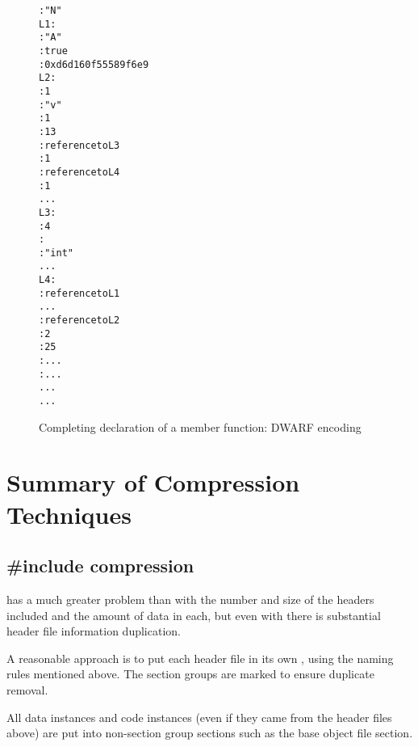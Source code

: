 \begin{figure}[h]
\begin{dwflisting}
\begin{alltt}
  \DWTAGnamespace
      \DWATname{} : "N"
L1:
    \DWTAGclasstype
        \DWATname{} : "A"
        \DWATdeclaration{} : true
        \DWATsignature{} : 0xd6d160f5 5589f6e9
L2:
      \DWTAGsubprogram
          \DWATexternal{} : 1
          \DWATname{} : "v"
          \DWATdeclfile{} : 1
          \DWATdeclline{} : 13
          \DWATtype{} : reference to L3
          \DWATdeclaration{} : 1
        \DWTAGformalparameter
            \DWATtype{} : reference to L4
            \DWATartificial{} : 1
...
L3:
  \DWTAGbasetype
      \DWATbytesize{} : 4
      \DWATencoding{} : \DWATEsigned
      \DWATname{} : "int"
...
L4:
  \DWTAGpointertype
      \DWATtype{} : reference to L1
...
  \DWTAGsubprogram
      \DWATspecification{} : reference to L2
      \DWATdeclfile{} : 2
      \DWATdeclline{} : 25
      \DWATlowpc{} : ...
      \DWAThighpc{} : ...
    \DWTAGlexicalblock
    ...
...
\end{alltt}
\end{dwflisting}
\caption{Completing declaration of a member function: DWARF \mbox{encoding}}
\label{fig:completingedeclarationofamemberfunctiondwarf}
\end{figure}


\clearpage
\section{Summary of Compression Techniques}
\label{app:summaryofcompressiontechniques}
\subsection{\#include compression}
\label{app:includecompression}

 has a much greater 
problem than 
 with the number and
size of the headers included and the amount of data in each,
but even with  
there is substantial header file information
duplication.

A reasonable approach is to put each header file in its own
, using the naming rules mentioned above. The
section groups are marked to ensure duplicate removal.

All data instances and code instances (even if they came
from the header files above) are put 
into non-section group
sections such as the base object file 
\dotdebuginfo{} section.

